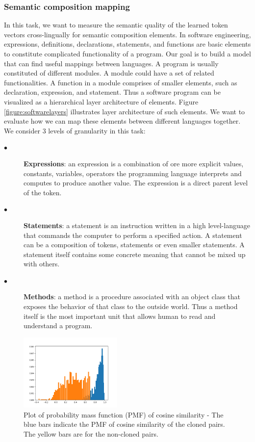 \subsubsection{Semantic composition mapping}
In this task, we want to measure the semantic quality of the learned token vectors cross-lingually for semantic composition elements. In software engineering, expressions, definitions, declarations, statements, and functions are basic elements to constitute complicated functionality of a program. Our goal is to build a model that can find useful mappings between languages. A program is usually constituted of different modules. A module could have a set of related functionalities. A function in a module comprises of smaller elements, such as declaration, expression, and statement. Thus a software program can be visualized as a hierarchical layer architecture of elements. Figure \ref{figure:softwarelayers} illustrates layer architecture of such elements. We want to evaluate how we can map these elements between different languages together. We consider 3 levels of granularity in this task:

\begin{description}
	\item [$\bullet$] \textbf{Expressions}: an expression is a combination of ore more explicit values, constants, variables, operators the programming language interprets and computes to produce another value. The expression is a direct parent level of the token.
	
	\item [$\bullet$] \textbf{Statements}: a statement is an instruction written in a high level-language that commands the computer to perform a specified action. A statement can be a composition of tokens, statements or even smaller statements. A statement itself contains some concrete meaning that cannot be mixed up with others.
	
	\item [$\bullet$] \textbf{Methods}: a method is a procedure associated with an object class that exposes the behavior of that class to the outside world. Thus a method itself is the most important unit that allows human to read and understand a program.
	
\end{description}
\begin{figure}[t!]
	\includegraphics[width=0.45\textwidth]{clone_distribution}
	\caption{Plot of probability mass function (PMF) of cosine similarity - The blue bars indicate the PMF of cosine similarity of the cloned pairs. The yellow bars are for the non-cloned pairs.}
	\label{fig:clone_distribution}
\end{figure}

